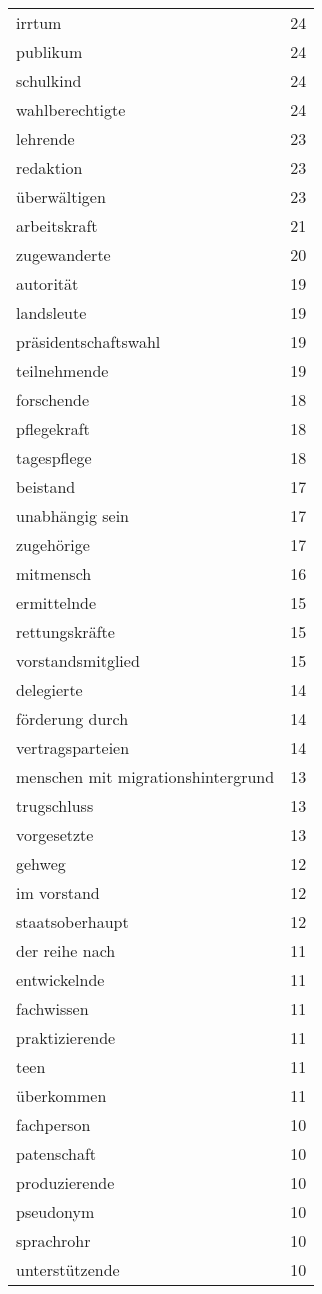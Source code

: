 \begin{tabular}{ll}
irrtum & 24\\
publikum & 24\\
schulkind & 24\\
wahlberechtigte & 24\\
lehrende & 23\\
redaktion & 23\\
überwältigen & 23\\
arbeitskraft & 21\\
zugewanderte & 20\\
autorität & 19\\
landsleute & 19\\
präsidentschaftswahl & 19\\
teilnehmende & 19\\
forschende & 18\\
pflegekraft & 18\\
tagespflege & 18\\
beistand & 17\\
unabhängig sein & 17\\
zugehörige & 17\\
mitmensch & 16\\
ermittelnde & 15\\
rettungskräfte & 15\\
vorstandsmitglied & 15\\
delegierte & 14\\
förderung durch & 14\\
vertragsparteien & 14\\
menschen mit migrationshintergrund & 13\\
trugschluss & 13\\
vorgesetzte & 13\\
gehweg & 12\\
im vorstand & 12\\
staatsoberhaupt & 12\\
der reihe nach & 11\\
entwickelnde & 11\\
fachwissen & 11\\
praktizierende & 11\\
teen & 11\\
überkommen & 11\\
fachperson & 10\\
patenschaft & 10\\
produzierende & 10\\
pseudonym & 10\\
sprachrohr & 10\\
unterstützende & 10\\

\end{tabular}
